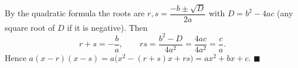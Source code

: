 By the quadratic formula the roots are $r,s=\dfrac{-b\pm\sqrt{D}}{2a}$ with $D=b^2-4ac$ (any square root of $D$ if it is negative). Then
\[r+s=-\dfrac ba,\qquad rs=\dfrac{b^2-D}{4a^2}=\dfrac{4ac}{4a^2}=\dfrac ca.\]
Hence $a(x-r)(x-s)=a\bigl(x^2-(r+s)x+rs\bigr)=ax^2+bx+c$. $\blacksquare$
